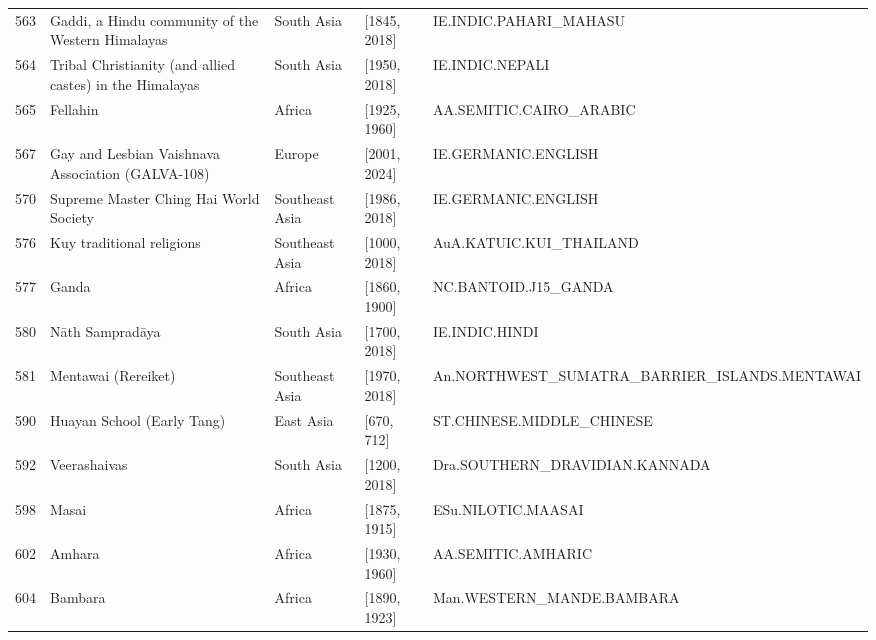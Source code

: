 {\begin{longtable}{rp{3.5cm}llp{3.5cm}}
563 & {\raggedright Gaddi, a Hindu community of the Western Himalayas} & South Asia & [1845, 2018] & {\raggedright IE.\allowbreak{}INDIC.\allowbreak{}PAHARI\_\allowbreak{}MAHASU} \\
564 & {\raggedright Tribal Christianity (and allied castes) in the Himalayas} & South Asia & [1950, 2018] & {\raggedright IE.\allowbreak{}INDIC.\allowbreak{}NEPALI} \\
565 & {\raggedright Fellahin} & Africa & [1925, 1960] & {\raggedright AA.\allowbreak{}SEMITIC.\allowbreak{}CAIRO\_\allowbreak{}ARABIC} \\
567 & {\raggedright Gay and Lesbian Vaishnava Association (GALVA-108)} & Europe & [2001, 2024] & {\raggedright IE.\allowbreak{}GERMANIC.\allowbreak{}ENGLISH} \\
570 & {\raggedright Supreme Master Ching Hai World Society} & Southeast Asia & [1986, 2018] & {\raggedright IE.\allowbreak{}GERMANIC.\allowbreak{}ENGLISH} \\
576 & {\raggedright Kuy traditional religions} & Southeast Asia & [1000, 2018] & {\raggedright AuA.\allowbreak{}KATUIC.\allowbreak{}KUI\_\allowbreak{}THAILAND} \\
577 & {\raggedright Ganda} & Africa & [1860, 1900] & {\raggedright NC.\allowbreak{}BANTOID.\allowbreak{}J15\_\allowbreak{}GANDA} \\
580 & {\raggedright Nāth Sampradāya} & South Asia & [1700, 2018] & {\raggedright IE.\allowbreak{}INDIC.\allowbreak{}HINDI} \\
581 & {\raggedright Mentawai (Rereiket)} & Southeast Asia & [1970, 2018] & {\raggedright An.\allowbreak{}NORTHWEST\_\allowbreak{}SUMATRA\_\allowbreak{}BARRIER\_\allowbreak{}ISLANDS.\allowbreak{}MENTAWAI} \\
590 & {\raggedright Huayan School (Early Tang)} & East Asia & [670, 712] & {\raggedright ST.\allowbreak{}CHINESE.\allowbreak{}MIDDLE\_\allowbreak{}CHINESE} \\
592 & {\raggedright Veerashaivas} & South Asia & [1200, 2018] & {\raggedright Dra.\allowbreak{}SOUTHERN\_\allowbreak{}DRAVIDIAN.\allowbreak{}KANNADA} \\
598 & {\raggedright Masai} & Africa & [1875, 1915] & {\raggedright ESu.\allowbreak{}NILOTIC.\allowbreak{}MAASAI} \\
602 & {\raggedright Amhara} & Africa & [1930, 1960] & {\raggedright AA.\allowbreak{}SEMITIC.\allowbreak{}AMHARIC} \\
604 & {\raggedright Bambara} & Africa & [1890, 1923] & {\raggedright Man.\allowbreak{}WESTERN\_\allowbreak{}MANDE.\allowbreak{}BAMBARA} \\

\end{longtable}}
